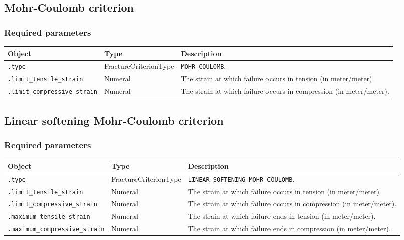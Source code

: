 \documentclass[10pt]{article}
\begin{document}
\subsection{Mohr-Coulomb criterion}

\subsubsection*{Required parameters}

\begin{tabularx}{\textwidth}{llX}
\hline 
Object & Type & Description \\ 
\hline 
\verb+.type+ & FractureCriterionType & \verb+MOHR_COULOMB+. \\ 
\verb+.limit_tensile_strain+ & Numeral & The strain at which failure occurs in tension (in meter/meter).\\
\verb+.limit_compressive_strain+ & Numeral & The strain at which failure occurs in compression (in meter/meter).\\
\hline 
\end{tabularx}

\subsection{Linear softening Mohr-Coulomb criterion}

\subsubsection*{Required parameters}

\begin{tabularx}{\textwidth}{llX}
\hline 
Object & Type & Description \\ 
\hline 
\verb+.type+ & FractureCriterionType & \verb+LINEAR_SOFTENING_MOHR_COULOMB+. \\ 
\verb+.limit_tensile_strain+ & Numeral & The strain at which failure occurs in tension (in meter/meter).\\
\verb+.limit_compressive_strain+ & Numeral & The strain at which failure occurs in compression (in meter/meter).\\
\verb+.maximum_tensile_strain+ & Numeral & The strain at which failure ends in tension (in meter/meter).\\
\verb+.maximum_compressive_strain+ & Numeral & The strain at which failure ends in compression (in meter/meter).\\
\hline 
\end{tabularx}
\end{document}
